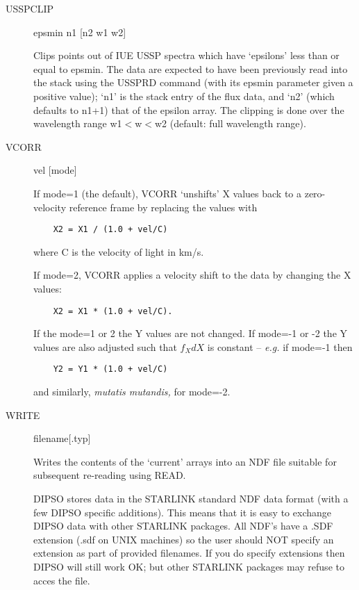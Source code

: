 \begin {description}
\item [USSPCLIP] epsmin n1 [n2 w1 w2]

Clips points out of IUE USSP spectra which have `epsilons' less than
or equal to epsmin. The data are expected to have been previously read
into the stack using the USSPRD command (with its epsmin parameter
given a positive value); `n1' is the stack entry of the flux data, and
`n2' (which defaults to n1+1) that of the epsilon array. The clipping
is done over the wavelength range w1$<$w$<$w2 (default: full
wavelength range).

\item [VCORR] vel [mode]

If mode=1 (the default), VCORR `unshifts' X values back to a
zero-velocity reference frame by replacing the values with

\begin{verbatim}
    X2 = X1 / (1.0 + vel/C)
\end{verbatim}

where C is the velocity of light in km/s.

If mode=2, VCORR applies a velocity shift to the data by changing the
X values:

\begin{verbatim}
    X2 = X1 * (1.0 + vel/C).
\end{verbatim}

If the mode=1 or 2 the Y values are not changed. If mode=-1 or -2 the
Y values are also adjusted such that $f_{X}dX$ is constant -- {\it
e.g.} if mode=-1 then

\begin{verbatim}
    Y2 = Y1 * (1.0 + vel/C)
\end{verbatim}

and similarly, {\it mutatis mutandis,} for mode=-2.

\item [WRITE] filename[.typ]

Writes the contents of the `current' arrays into an NDF file suitable
for subsequent re-reading using READ.

DIPSO stores data in the STARLINK standard NDF data format (with a few
DIPSO specific additions). This means that it is easy to exchange
DIPSO data with other STARLINK packages. All NDF's have a .SDF
extension (.sdf on UNIX machines) so the user should NOT specify an
extension as part of provided filenames. If you do specify extensions
then DIPSO will still work OK; but other STARLINK packages may refuse
to acces the file.


\end{description}
